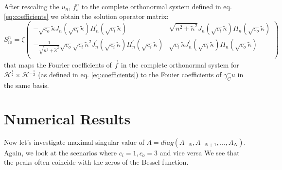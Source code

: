 \documentclass[10pt,journal,compsoc, onecolumn]{IEEEtran}
\begin{document}
After rescaling the $u_n$, $f_i^n$ to the complete orthonormal system defined in eq. \ref{eq:coefficients}
we obtain the solution operator matrix: 
\begin{equation}
    S_{io}^n = 
    \zeta
    \begin{pmatrix}
        -\sqrt{c_o}\tilde \kappa J_n(\sqrt{c_i} \tilde \kappa) H_n^\prime(\sqrt{c_i} \tilde \kappa) & 
        \sqrt{n^2 + \tilde \kappa^2} J_n(\sqrt{c_i} \tilde \kappa) H_n(\sqrt{c_o} \tilde \kappa)  \\
        -\frac{1}{\sqrt{n^2 + \tilde \kappa^2}}\sqrt{c_o}\sqrt{c_i} \tilde \kappa^2 J^\prime_n(\sqrt{c_i} \tilde \kappa) H_n^\prime(\sqrt{c_i} \tilde \kappa) & 
        \sqrt{c_i} \tilde \kappa J^\prime_n(\sqrt{c_i} \tilde \kappa) H_n(\sqrt{c_o} \tilde \kappa) \\
    \end{pmatrix}
\end{equation}
that maps the Fourier coefficients of $\vec{f}$ in the complete orthonormal system for $\mathcal{H}^{\frac{1}{2}}\times \mathcal{H}^{-\frac{1}{2}}$
(as defined in eq. \ref{eq:coefficients}) to the Fouier coefficients of $\gamma_C^-u$ in the same basis.

\section{Numerical Results}
Now let's investigate maximal singular value of $A = diag(A_{-N}, A_{-N + 1}, ..., A_{N})$. 
Again, we look at the scenarios where $c_i = 1, c_o = 3$ and vice versa 
We see that the peaks often coincide with the zeros of the Bessel function. 
\end{document}
